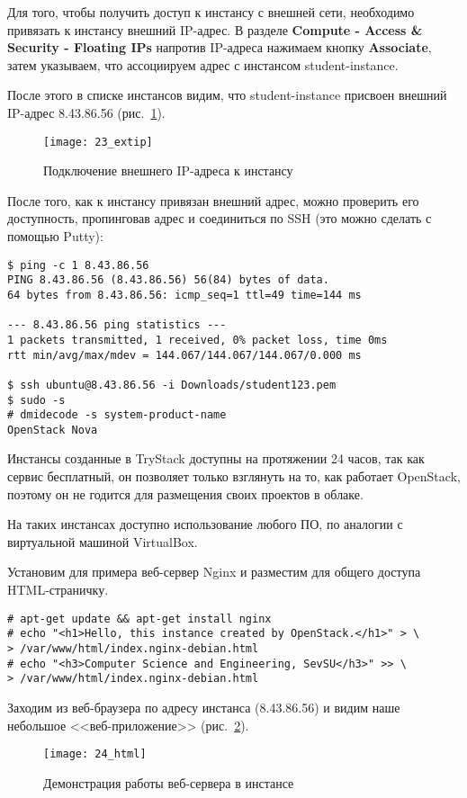 \clearpage

Для того, чтобы получить доступ к инстансу с внешней сети, необходимо привязать к инстансу внешний IP-адрес.
В разделе \textbf{Compute - Access \& Security - Floating IPs} напротив IP-адреса нажимаем кнопку \textbf{Associate}, затем указываем, что ассоциируем адрес с инстансом student-instance.

После этого в списке инстансов видим, что student-instance присвоен внешний IP-адрес 8.43.86.56 (рис.~\ref{pic:extip}).
\begin{figure}[ht]
    \centering
    \texttt{[image: 23\_extip]}
    \caption{Подключение внешнего IP-адреса к инстансу}\label{pic:extip}
\end{figure}

После того, как к инстансу привязан внешний адрес, можно проверить его доступность, пропинговав адрес и соединиться по SSH (это можно сделать с помощью Putty):
\begin{lstlisting}
$ ping -c 1 8.43.86.56
PING 8.43.86.56 (8.43.86.56) 56(84) bytes of data.
64 bytes from 8.43.86.56: icmp_seq=1 ttl=49 time=144 ms

--- 8.43.86.56 ping statistics ---
1 packets transmitted, 1 received, 0% packet loss, time 0ms
rtt min/avg/max/mdev = 144.067/144.067/144.067/0.000 ms

$ ssh ubuntu@8.43.86.56 -i Downloads/student123.pem
$ sudo -s
# dmidecode -s system-product-name
OpenStack Nova
\end{lstlisting}

Инстансы созданные в TryStack доступны на протяжении 24 часов, так как сервис бесплатный, он позволяет только взглянуть на то, как работает OpenStack, поэтому он не годится для размещения своих проектов в облаке.

На таких инстансах доступно использование любого ПО, по аналогии с виртуальной машиной VirtualBox.

Установим для примера веб-сервер Nginx и разместим для общего доступа HTML-страничку.
\begin{lstlisting}
# apt-get update && apt-get install nginx
# echo "<h1>Hello, this instance created by OpenStack.</h1>" > \
> /var/www/html/index.nginx-debian.html
# echo "<h3>Computer Science and Engineering, SevSU</h3>" >> \
> /var/www/html/index.nginx-debian.html
\end{lstlisting}

Заходим из веб-браузера по адресу инстанса (8.43.86.56) и видим наше небольшое <<веб-приложение>> (рис.~\ref{pic:html}).
\begin{figure}[ht]
    \centering
    \texttt{[image: 24\_html]}
    \caption{Демонстрация работы веб-сервера в инстансе}\label{pic:html}
\end{figure}

\clearpage
